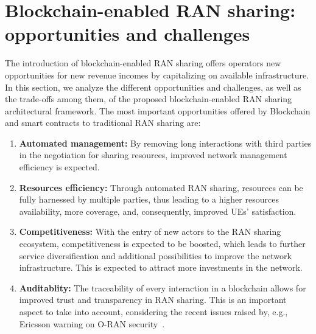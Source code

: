 \documentclass[journal]{IEEEtran}
\begin{document}
	\section{Blockchain-enabled RAN sharing: opportunities and challenges}
	\label{section:results}
	The introduction of blockchain-enabled RAN sharing offers operators new opportunities for new revenue incomes by capitalizing on available infrastructure. In this section, we analyze the different opportunities and challenges, as well as the trade-offs among them, of the proposed blockchain-enabled RAN sharing architectural framework. The most important opportunities offered by Blockchain and smart contracts to traditional RAN sharing are:
	\begin{enumerate}
		\item \textbf{Automated management:} By removing long interactions with third parties in the negotiation for sharing resources, improved network management efficiency is expected.
		\item \textbf{Resources efficiency:} Through automated RAN sharing, resources can be fully harnessed by multiple parties, thus leading to a higher resources availability, more coverage, and, consequently, improved UEs' satisfaction.
		\item \textbf{Competitiveness:} With the entry of new actors to the RAN sharing ecosystem, competitiveness is expected to be boosted, which leads to further service diversification and additional possibilities to improve the network infrastructure. This is expected to attract more investments in the network.
		\item \textbf{Auditablity:} The traceability of every interaction in a blockchain allows for improved trust and transparency in RAN sharing. This is an important aspect to take into account, considering the recent issues raised by, e.g., Ericsson warning on O-RAN security~\cite{boswell2020security}.
	\end{enumerate}
	
\end{document}
